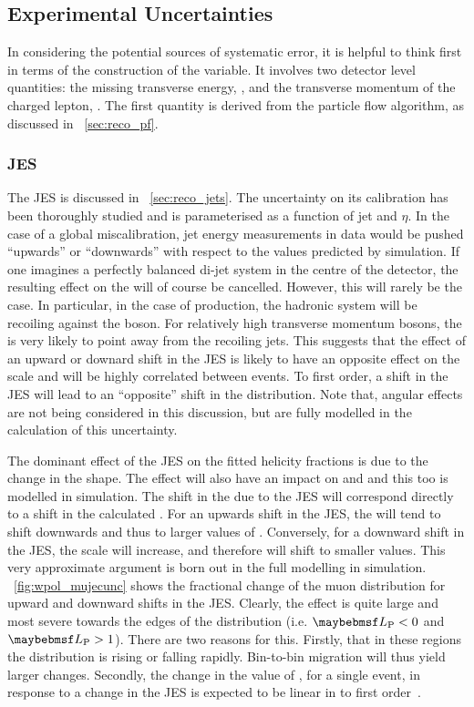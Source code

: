 \subsection{Experimental Uncertainties}
In considering the potential sources of systematic error, it is helpful to think
first in terms of the construction of the \LP variable. It involves two detector
level quantities: the missing transverse energy, \METv, and the transverse
momentum of the charged lepton, \Ptlv. The first quantity is derived from the
particle flow algorithm, as discussed in \sec~\ref{sec:reco_pf}.

\subsubsection{\acl{JES}}
\label{sec:wpol_syst_jec}
The \ac{JES} is discussed in \sec~\ref{sec:reco_jets}. The uncertainty on its
calibration has been thoroughly studied and is parameterised as a function of
jet \Pt and $\eta$. In the case of a global miscalibration, jet energy
measurements in data would be pushed ``upwards'' or ``downwards'' with respect
to the values predicted by simulation. If one imagines a perfectly balanced
di-jet system in the centre of the detector, the resulting effect on the \METv
will of course be cancelled. However, this will rarely be the case. In
particular, in the case of \Wjets production, the hadronic system will be
recoiling against the \PW boson. For relatively high transverse momentum \PW
bosons, the \METv is very likely to point away from the recoiling jets. This
suggests that the effect of an upward or downard shift in the \ac{JES} is likely
to have an opposite effect on the \METv scale and will be highly correlated
between events. To first order, a shift in the \ac{JES} will lead to an
``opposite'' shift in the \MET distribution. Note that, angular effects are not
being considered in this discussion, but are fully modelled in the calculation
of this uncertainty.

The dominant effect of the \ac{JES} on the fitted helicity fractions is due to
the change in the \LP shape. The effect will also have an impact on \PtW and \MT
and this too is modelled in simulation. The shift in the \MET due to the
\ac{JES} will correspond directly to a shift in the calculated \LP. For an
upwards shift in the \ac{JES}, the \MET will tend to shift downwards and thus to
larger values of \LP. Conversely, for a downward shift in the \ac{JES}, the \MET
scale will increase, and therefore \LP will shift to smaller values. This very
approximate argument is born out in the full modelling in
simulation. \fig~\ref{fig:wpol_mujecunc} shows the fractional change of the muon
\LP distribution for upward and downward shifts in the \ac{JES}. Clearly, the
effect is quite large and most severe towards the edges of the \LP distribution
(i.e. $\LP < 0$ and $\LP > 1$). There are two reasons for this. Firstly, that in
these regions the \LP distribution is rising or falling rapidly. Bin-to-bin
migration will thus yield larger changes. Secondly, the change in the value of
\LP, for a single event, in response to a change in the \ac{JES} is expected to
be linear in \LP to first order~\cite{susy_ra4_pas}.

